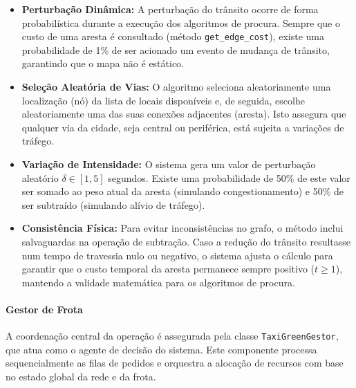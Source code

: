\documentclass[11pt, a4paper, fleqn]{article}
\begin{document}
	\begin{itemize}
		\item \textbf{Perturbação Dinâmica:} A perturbação do trânsito ocorre de forma probabilística durante a execução dos algoritmos de procura. Sempre que o custo de uma aresta é consultado (método \texttt{get\_edge\_cost}), existe uma probabilidade de 1\% de ser acionado um evento de mudança de trânsito, garantindo que o mapa não é estático.
		
		\item \textbf{Seleção Aleatória de Vias:} O algoritmo seleciona aleatoriamente uma localização (nó) da lista de locais disponíveis e, de seguida, escolhe aleatoriamente uma das suas conexões adjacentes (aresta). Isto assegura que qualquer via da cidade, seja central ou periférica, está sujeita a variações de tráfego.
		
		\item \textbf{Variação de Intensidade:} O sistema gera um valor de perturbação aleatório $\delta \in [1, 5]$ segundos. Existe uma probabilidade de 50\% de este valor ser somado ao peso atual da aresta (simulando congestionamento) e 50\% de ser subtraído (simulando alívio de tráfego).
		
		\item \textbf{Consistência Física:} Para evitar inconsistências no grafo, o método inclui salvaguardas na operação de subtração. Caso a redução do trânsito resultasse num tempo de travessia nulo ou negativo, o sistema ajusta o cálculo para garantir que o custo temporal da aresta permanece sempre positivo ($t \ge 1$), mantendo a validade matemática para os algoritmos de procura.
	\end{itemize}
	
	\paragraph{Gestor de Frota}
	A coordenação central da operação é assegurada pela classe \texttt{TaxiGreenGestor}, que atua como o agente de decisão do sistema. Este componente processa sequencialmente as filas de pedidos e orquestra a alocação de recursos com base no estado global da rede e da frota.
	
\end{document}
